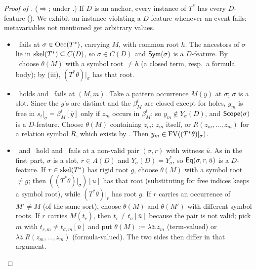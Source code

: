\begin{proof}[Proof of ]
($\Rightarrow$; under \Rich.) If $D$ is an anchor, every instance of $T^*$ has every $D$-feature (). We exhibit an instance violating a $D$-feature whenever an event fails; metavariables not mentioned get arbitrary values.
\begin{itemize}
\item \evRs\ fails at $\sigma\in\mathrm{Occ}(T^*)$, carrying $M$, with common root $h$. The ancestors of $\sigma$ lie in $\mathrm{skel}(T^*)\subseteq C(D)$, so $\sigma\in C(D)$ and $\mathsf{Sym}(\sigma)$ is a $D$-feature. By \Rich\ choose $\theta(M)$ with a symbol root $\neq h$ (a closed term, resp.\ a formula body); by (iii), $(T^*\theta)|_\sigma$ has that root.
\item \evRs\ holds and \evN\ fails at $(M,m)$. Take a pattern occurrence $M(\bar y)$ at $\sigma$; $\sigma$ is a slot. Since the $y$'s are distinct and the $\beta^i_M$ are closed except for holes, $y_m$ is free in $s_i|_\sigma=\beta^i_M[\bar y]$ only if $z_m$ occurs in $\beta^i_M$; so $y_m\notin Y_\sigma(D)$, and $\mathsf{Scope}(\sigma)$ is a $D$-feature. Choose $\theta(M)$ containing $z_m$: $z_m$ itself, or $R(z_m,\dots,z_m)$ for a relation symbol $R$, which exists by \Rich. Then $y_m\in\mathrm{FV}((T^*\theta)|_\sigma)$.
\item \evRs\ and \evN\ hold and \evU\ fails at a non-valid pair $(\sigma,r)$ with witness $\bar u$. As in the first part, $\sigma$ is a slot, $r\in A(D)$ and $Y_\sigma(D)=Y^*_\sigma$, so $\mathsf{Eq}(\sigma,r,\bar u)$ is a $D$-feature. If $r\in\mathrm{skel}(T^*)$ has rigid root $g$, choose $\theta(M)$ with a symbol root $\neq g$; then $((T^*\theta)|_\sigma)[\bar u]$ has that root (substituting for free indices keeps a symbol root), while $(T^*\theta)|_r$ has root $g$. If $r$ carries an occurrence of $M'\neq M$ (of the same sort), choose $\theta(M)$ and $\theta(M')$ with different symbol roots. If $r$ carries $M(\bar t_r)$, then $\bar t_r\neq\bar t_\sigma[\bar u]$ because the pair is not valid; pick $m$ with $t_{r,m}\neq t_{\sigma,m}[\bar u]$ and put $\theta(M):=\lambda\bar z.z_m$ (term-valued) or $\lambda\bar z.R(z_m,\dots,z_m)$ (formula-valued). The two sides then differ in that argument.\qedhere
\end{itemize}
\end{proof}

